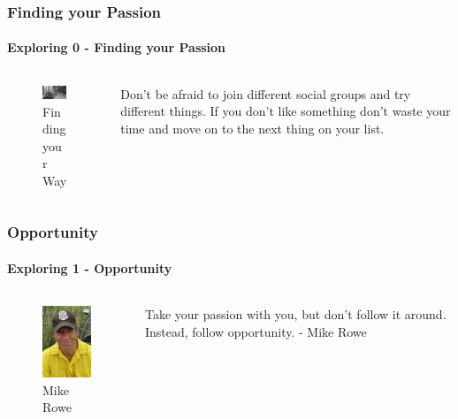\documentclass[aspectratio=169]{beamer}
\begin{document}
\begin{frame}
  \frametitle{Finding your Passion}
  \framesubtitle{Exploring 0 - Finding your Passion}
  \begin{columns}[onlytextwidth]
    \begin{column}{.30\textwidth}
      \begin{figure}
        \includegraphics[width=5.5cm,keepaspectratio]{compass}
        \caption{Finding your Way}
      \end{figure}
    \end{column}
    \hfill
    \begin{column}{.60\textwidth}
        \begin{tcolorbox}[title=finding\_your\_passion.log,colback=gray]
          Don't be afraid to join different social groups and try different things.
          If you don't like something don't waste your time and move on to the next thing on your list.
        \end{tcolorbox}
    \end{column}
  \end{columns}
\end{frame}

\begin{frame}
  \frametitle{Opportunity}
  \framesubtitle{Exploring 1 - Opportunity}
  \begin{columns}[onlytextwidth]
    \begin{column}{.30\textwidth}
      \begin{figure}
        \includegraphics[width=4cm,keepaspectratio]{mike_rowe}
        \caption{Mike Rowe}
      \end{figure}
    \end{column}
    \hfill
    \begin{column}{.60\textwidth}
        \begin{tcolorbox}[title=mike\_rowe.log,colback=gray]
          Take your passion with you, but don't follow it around. Instead, follow opportunity. - Mike Rowe
        \end{tcolorbox}
    \end{column}
  \end{columns}
\end{frame}
\end{document}
